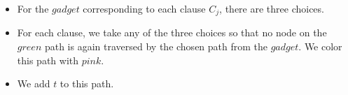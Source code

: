 \begin{itemize}
    \item For the $gadget$ corresponding to each clause $C_j$, there are three choices.
    \item For each clause, we take any of the three choices so that no node on the $green$ path is again traversed by the chosen path from the $gadget$. We color this path with $pink$.
    \item We add $t$ to this path.
\end{itemize}